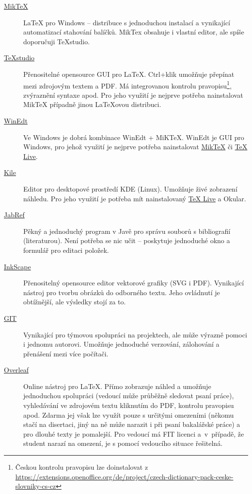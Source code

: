 \begin{description}
	\item[\href{http://miktex.org/download}{MikTeX}] \LaTeX{} pro Windows -- distribuce s jednoduchou instalací a vynikající automatizací stahování balíčků. MikTex obsahuje i vlastní editor, ale spíše doporučuji TeXstudio.
	\item[\href{http://texstudio.sourceforge.net/}{TeXstudio}] Přenositelné opensource GUI pro \LaTeX{}.  Ctrl+klik umožňuje přepínat mezi zdrojovým textem a PDF. Má integrovanou kontrolu pravopisu\footnote{Českou kontrolu pravopisu lze doinstalovat z \url{https://extensions.openoffice.org/de/project/czech-dictionary-pack-ceske-slovniky-cs-cz}}, zvýraznění syntaxe apod. Pro jeho využití je nejprve potřeba nainstalovat MikTeX případně jinou \LaTeX ovou distribuci.
	\item[\href{http://www.winedt.com/}{WinEdt}] Ve Windows je dobrá kombinace WinEdt + MiKTeX. WinEdt je GUI pro Windows, pro jehož využití je nejprve potřeba nainstalovat \href{http://miktex.org/download}{MikTeX} či \href{http://www.tug.org/texlive/}{TeX Live}.
	\item[\href{http://kile.sourceforge.net/}{Kile}] Editor pro desktopové prostředí KDE (Linux). Umožňuje živé zobrazení náhledu. Pro jeho využití je potřeba mít nainstalovaný \href{http://www.tug.org/texlive/}{TeX Live} a Okular.
	\item[\href{http://jabref.sourceforge.net/download.php}{JabRef}] Pěkný a jednoduchý program v Javě pro správu souborů s bibliografií (literaturou). Není potřeba se nic učit -- poskytuje jednoduché okno a formulář pro editaci položek.
	\item[\href{https://inkscape.org/en/download/}{InkScape}] Přenositelný opensource editor vektorové grafiky (SVG i PDF). Vynikající nástroj pro tvorbu obrázků do odborného textu. Jeho ovládnutí je obtížnější, ale výsledky stojí za to.
	\item[\href{https://git-scm.com/}{GIT}] Vynikající pro týmovou spolupráci na projektech, ale může výrazně pomoci i jednomu autorovi. Umožňuje jednoduché verzování, zálohování a přenášení mezi více počítači.
	\item[\href{http://www.overleaf.com/}{Overleaf}] Online nástroj pro \LaTeX{}. Přímo zobrazuje náhled a umožňuje jednoduchou spolupráci (vedoucí může průběžně sledovat psaní práce), vyhledávání ve zdrojovém textu kliknutím do PDF, kontrolu pravopisu apod. Zdarma jej však lze využít pouze s určitými omezeními (někomu stačí na disertaci, jiný na ně může narazit i při psaní bakalářské práce) a pro dlouhé texty je pomalejší. Pro vedoucí má FIT licenci a~v~případě, že student narazí na omezení, je s pomocí vedoucího situace řešitelná.
\end{description}

